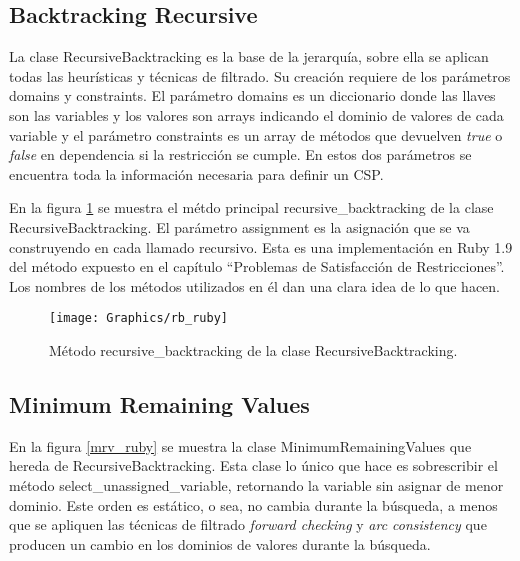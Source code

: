 \subsection{Backtracking Recursive}

La clase \textsf{RecursiveBacktracking} es la base de la jerarqu\'ia, sobre ella se aplican todas las heur\'isticas y t\'ecnicas de filtrado. Su creaci\'on requiere de los par\'ametros \textsf{domains} y \textsf{constraints}. El par\'ametro \textsf{domains} es un diccionario donde las llaves son las variables y los valores son arrays indicando el dominio de valores de cada variable y el par\'ametro \textsf{constraints} es un array de m\'etodos que devuelven \emph{true} o \emph{false} en dependencia si la restricci\'on se cumple. En estos dos par\'ametros se encuentra toda la informaci\'on necesaria para definir un CSP.

En la figura \ref{rb_ruby} se muestra el m\'etdo principal \textsf{recursive\_backtracking} de la clase \textsf{RecursiveBacktracking}. El par\'ametro \textsf{assignment} es la asignaci\'on que se va construyendo en cada llamado recursivo. Esta es una implementaci\'on en Ruby 1.9 del m\'etodo expuesto en el cap\'itulo ``Problemas de Satisfacci\'on de Restricciones''. Los nombres de los m\'etodos utilizados en \'el dan una clara idea de lo que hacen.

\begin{figure}
	\begin{center}
		\texttt{[image: Graphics/rb\_ruby]}
		\caption{M\'etodo \textsf{recursive\_backtracking} de la clase \textsf{RecursiveBacktracking}.}
		\label{rb_ruby}
	\end{center}	
\end{figure}

\subsection{Minimum Remaining Values}

En la figura \ref{mrv_ruby} se muestra la clase \textsf{MinimumRemainingValues} que hereda de \textsf{RecursiveBacktracking}. Esta clase lo \'unico que hace es sobrescribir el m\'etodo \textsf{select\_unassigned\_variable}, retornando la variable sin asignar de menor dominio. Este orden es est\'atico, o sea, no cambia durante la b\'usqueda, a menos que se apliquen las t\'ecnicas de filtrado \emph{forward checking} y \emph{arc consistency} que producen un cambio en los dominios de valores durante la b\'usqueda.


